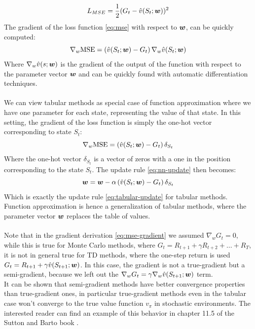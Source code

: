 \begin{equation}
    L_{MSE} = \frac{1}{2}(G_t - \hat{v}(S_t; \boldsymbol{w}))^2
    \label{eq:mse}
\end{equation}
The gradient of the loss function \eqref{eq:mse} with respect to $\boldsymbol{w}$, can be quickly computed:
\begin{equation}
    \nabla_{w} \mathrm{MSE} = \left( \hat{v}(S_t; \boldsymbol{w}) - G_t \right) \nabla_w \hat{v}(S_t; \boldsymbol{w})
    \label{eq:mse-gradient}
\end{equation}
Where $\nabla_w \hat{v}(s; \boldsymbol{w})$ is the gradient of the output of the function with respect to the parameter vector $\boldsymbol{w}$ and can be quickly found with automatic differentiation techniques.\\\\
We can view tabular methods as special case of function approximation where we have one parameter for each state, representing the value of that state. In this setting, the gradient of the loss function is simply the one-hot vector corresponding to state $S_t$:
\begin{equation}
    \nabla_w \mathrm{MSE} = \left( \hat{v}(S_t; \boldsymbol{w}) - G_t \right) \delta_{S_t}
    \label{eq:tabular-mse-gradient}
\end{equation}
Where the one-hot vector $\delta_{S_t}$ is a vector of zeros with a one in the position corresponding to the state $S_t$. The update rule \eqref{eq:nn-update} then becomes:
\begin{equation}
    \boldsymbol{w} = \boldsymbol{w} - \alpha \left( \hat{v}(S_t; \boldsymbol{w}) - G_t \right) \delta_{S_t}
    \label{eq:approximation-tabular-update}
\end{equation}
Which is exactly the update rule \eqref{eq:tabular-update} for tabular methods. Function approximation is hence a generalization of tabular methods, where the parameter vector $\boldsymbol{w}$ replaces the table of values.\\\\
Note that in the gradient derivation \eqref{eq:mse-gradient} we assumed $\nabla_w G_t = 0$, while this is true for Monte Carlo methods, where $G_t = R_{t+1} + \gamma R_{t+2} + \dots + R_T$, it is not in general true for TD methods, where the one-step return is used $G_t = R_{t+1} + \gamma \hat{v}(S_{t+1}; \boldsymbol{w})$. In this case, the gradient is not a true-gradient but a semi-gradient, because we left out the $\nabla_w G_t = \gamma \nabla_w \hat{v}(S_{t+1}; \boldsymbol{w})$ term.\\
It can be shown that semi-gradient methods have better convergence properties than true-gradient ones, in particular true-gradient methods even in the tabular case won't converge to the true value function $v_{\pi}$ in stochastic environments. The interested reader can find an example of this behavior in chapter 11.5 of the Sutton and Barto book \cite{sutton-barto}.


